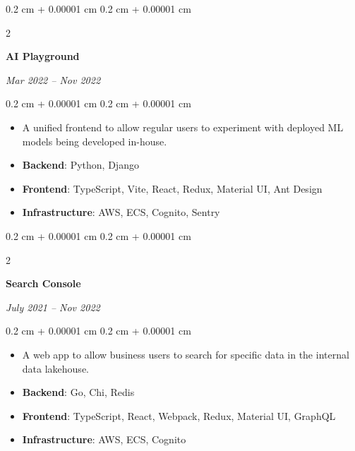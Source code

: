 \documentclass[10pt, a4paper]{article}
\newenvironment{highlights}{
    \begin{itemize}[
        topsep=0.10 cm,
        parsep=0.10 cm,
        partopsep=0pt,
        itemsep=0pt,
        leftmargin=0.4 cm + 10pt
    ]
}{
    \end{itemize}
} %
\newenvironment{onecolentry}{
    \begin{adjustwidth}{
        0.2 cm + 0.00001 cm
    }{
        0.2 cm + 0.00001 cm
    }
}{
    \end{adjustwidth}
} %
\newenvironment{twocolentry}[2][]{
    \onecolentry
    \def\secondColumn{#2}
    \setcolumnwidth{\fill, 4.5 cm}
    \begin{paracol}{2}
}{
    \switchcolumn \raggedleft \secondColumn
    \end{paracol}
    \endonecolentry
} %
\begin{document}
        \vspace{0.2 cm}

        \begin{twocolentry}{
            
            
        \textit{Mar 2022 – Nov 2022}}
            \textbf{AI Playground}
        \end{twocolentry}

        \vspace{0.10 cm}
        \begin{onecolentry}
            \begin{highlights}
                \item A unified frontend to allow regular users to experiment with deployed ML models being developed in-house.
                \item \textbf{Backend}: Python, Django
                \item \textbf{Frontend}: TypeScript, Vite, React, Redux, Material UI, Ant Design
                \item \textbf{Infrastructure}: AWS, ECS, Cognito, Sentry
            \end{highlights}
        \end{onecolentry}


        \vspace{0.2 cm}

        \begin{twocolentry}{
            
            
        \textit{July 2021 – Nov 2022}}
            \textbf{Search Console}
        \end{twocolentry}

        \vspace{0.10 cm}
        \begin{onecolentry}
            \begin{highlights}
                \item A web app to allow business users to search for specific data in the internal data lakehouse.
                \item \textbf{Backend}: Go, Chi, Redis
                \item \textbf{Frontend}: TypeScript, React, Webpack, Redux, Material UI, GraphQL
                \item \textbf{Infrastructure}: AWS, ECS, Cognito
            \end{highlights}
        \end{onecolentry}
\end{document}
